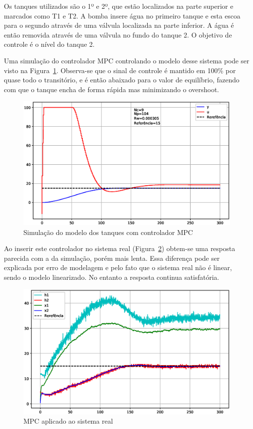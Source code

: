 Os tanques utilizados são o 1º e 2º, que estão localizados na parte superior e
marcados como T1 e T2. A bomba insere água no primeiro tanque e esta escoa para
o segundo através de uma válvula localizada na parte inferior. A água é então
removida através de uma válvula no fundo do tanque 2. O objetivo de controle é
o nível do tanque 2.

Uma simulação do controlador MPC controlando o modelo desse sistema pode ser
visto na Figura~\ref{fig:mpc-simulated}. Observa-se que o sinal de controle é
mantido em 100\% por quase todo o transitório, e é então abaixado para o valor
de equilíbrio, fazendo com que o tanque encha de forma rápida mas minimizando o
overshoot.

\begin{figure}[ht!]
    \centering
    \captionsetup{justification=centering}
    \includegraphics[height=0.5\linewidth]{imgs/mpc-simulado}
    \caption{Simulação do modelo dos tanques com controlador MPC}%
    \label{fig:mpc-simulated}
\end{figure}

Ao inserir este controlador no sistema real (Figura~\ref{fig:mpc-tanks})
obtem-se uma resposta parecida com a da simulação, porém mais lenta. Essa
diferença pode ser explicada por erro de modelagem e pelo fato que o sistema
real não é linear, sendo o modelo linearizado. No entanto a resposta continua
satisfatória.

\begin{figure}[ht!]
    \centering
    \captionsetup{justification=centering}
    \includegraphics[height=0.5\linewidth]{imgs/mpc-tanque}
    \caption{MPC aplicado ao sistema real}%
    \label{fig:mpc-tanks}
\end{figure}

